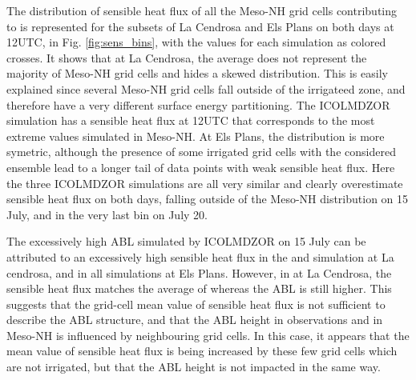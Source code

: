 The distribution of sensible heat flux of all the Meso-NH grid cells contributing to \mesomean is represented for the subsets of La Cendrosa and Els Plans on both days at 12UTC, in Fig. \ref{fig:sens_bins}, with the values for each simulation as colored crosses.
It shows that at La Cendrosa, the average does not represent the majority of Meso-NH grid cells and hides a skewed distribution. This is easily explained since several Meso-NH grid cells fall outside of the irrigateed zone, and therefore have a very different surface energy partitioning.
The ICOLMDZOR \noirr simulation has a sensible heat flux at 12UTC that corresponds to the most extreme values simulated in Meso-NH.
At Els Plans, the distribution is more symetric, although the presence of some irrigated grid cells with the considered ensemble lead to a longer tail of data points with weak sensible heat flux.
Here the three ICOLMDZOR simulations are all very similar and clearly overestimate sensible heat flux on both days, falling outside of the Meso-NH distribution on 15 July, and in the very last bin on July 20.

The excessively high ABL simulated by ICOLMDZOR on 15 July can be attributed to an excessively high sensible heat flux in the \noirr and \irr simulation at La cendrosa, and in all simulations at Els Plans. However, in \irrboost at La Cendrosa, the sensible heat flux matches the average of \mesomean whereas the ABL is still higher. This suggests that the grid-cell mean value of sensible heat flux is not sufficient to describe the ABL structure, and that the ABL height in observations and in Meso-NH is influenced by neighbouring grid cells. In this case, it appears that the mean value of sensible heat flux is being increased by these few grid cells which are not irrigated, but that the ABL height is not impacted in the same way.

